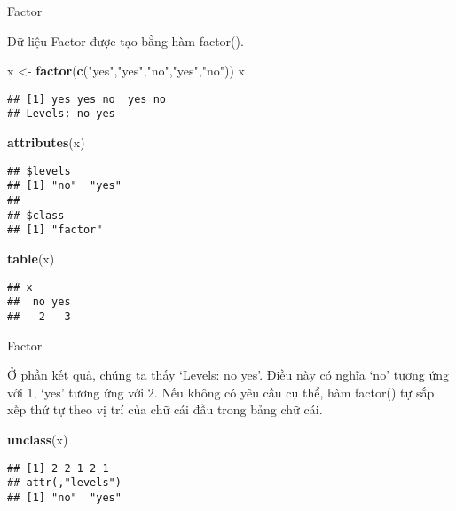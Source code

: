 \documentclass[
  ignorenonframetext,
]{beamer}
\newenvironment{Shaded}{}{}
\newcommand{\KeywordTok}[1]{\textcolor[rgb]{0.00,0.44,0.13}{\textbf{#1}}}
\newcommand{\NormalTok}[1]{#1}
\newcommand{\StringTok}[1]{\textcolor[rgb]{0.25,0.44,0.63}{#1}}
\begin{document}
\begin{frame}[fragile]{Factor}
\protect\hypertarget{factor-1}{}

Dữ liệu Factor được tạo bằng hàm factor().

\begin{Shaded}
\begin{Highlighting}[]
\NormalTok{x <-}\StringTok{ }\KeywordTok{factor}\NormalTok{(}\KeywordTok{c}\NormalTok{(}\StringTok{"yes"}\NormalTok{,}\StringTok{"yes"}\NormalTok{,}\StringTok{"no"}\NormalTok{,}\StringTok{"yes"}\NormalTok{,}\StringTok{"no"}\NormalTok{))}
\NormalTok{x}
\end{Highlighting}
\end{Shaded}

\begin{verbatim}
## [1] yes yes no  yes no 
## Levels: no yes
\end{verbatim}

\begin{Shaded}
\begin{Highlighting}[]
\KeywordTok{attributes}\NormalTok{(x)}
\end{Highlighting}
\end{Shaded}

\begin{verbatim}
## $levels
## [1] "no"  "yes"
## 
## $class
## [1] "factor"
\end{verbatim}

\begin{Shaded}
\begin{Highlighting}[]
\KeywordTok{table}\NormalTok{(x)}
\end{Highlighting}
\end{Shaded}

\begin{verbatim}
## x
##  no yes 
##   2   3
\end{verbatim}

\end{frame}

\begin{frame}[fragile]{Factor}
\protect\hypertarget{factor-2}{}

Ở phần kết quả, chúng ta thấy `Levels: no yes'. Điều này có nghĩa `no'
tương ứng với 1, `yes' tương ứng với 2. Nếu không có yêu cầu cụ thể, hàm
factor() tự sắp xếp thứ tự theo vị trí của chữ cái đầu trong bảng chữ
cái.

\begin{Shaded}
\begin{Highlighting}[]
\KeywordTok{unclass}\NormalTok{(x)}
\end{Highlighting}
\end{Shaded}

\begin{verbatim}
## [1] 2 2 1 2 1
## attr(,"levels")
## [1] "no"  "yes"
\end{verbatim}

\end{frame}
\end{document}
